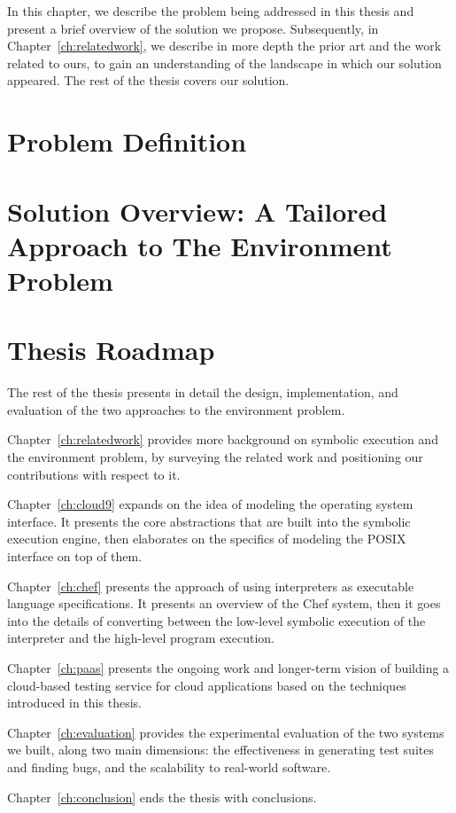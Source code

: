 In this chapter, we describe the problem being addressed in this thesis and present a brief overview of the solution we propose.
%
Subsequently, in Chapter~\ref{ch:relatedwork}, we describe in more depth the prior art and the work related to ours, to gain an understanding of the landscape in which our solution appeared.
%
The rest of the thesis covers our solution.

\section{Problem Definition}


\section{Solution Overview: A Tailored Approach to The Environment Problem}



\section{Thesis Roadmap}

The rest of the thesis presents in detail the design, implementation, and evaluation of the two approaches to the environment problem.

Chapter~\ref{ch:relatedwork} provides more background on symbolic execution and the environment problem, by surveying the related work and positioning our contributions with respect to it.

Chapter~\ref{ch:cloud9} expands on the idea of modeling the operating system interface.  It presents the core abstractions that are built into the symbolic execution engine, then elaborates on the specifics of modeling the POSIX interface on top of them.

Chapter~\ref{ch:chef} presents the approach of using interpreters as executable language specifications.  It presents an overview of the Chef system, then it goes into the details of converting between the low-level symbolic execution of the interpreter and the high-level program execution.

Chapter~\ref{ch:paas} presents the ongoing work and longer-term vision of building a cloud-based testing service for cloud applications based on the techniques introduced in this thesis.

Chapter~\ref{ch:evaluation} provides the experimental evaluation of the two systems we built, along two main dimensions: the effectiveness in generating test suites and finding bugs, and the scalability to real-world software.

Chapter~\ref{ch:conclusion} ends the thesis with conclusions.

